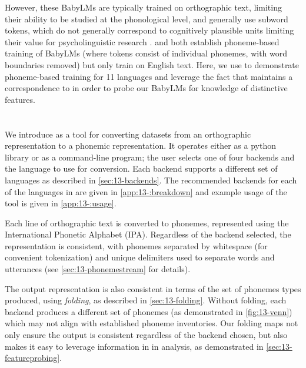 
However, these BabyLMs are typically trained on orthographic text, limiting their ability to be studied at the phonological level, and generally use subword tokens, which do not generally correspond to cognitively plausible units \citep{beinborn-pinter-2023-analyzing} limiting their value for psycholinguistic research \citep{giulianelli-etal-2024-proper}. \citet{bunzeck2024graphemes} and \citet{goriely2024babble} both establish phoneme-based training of BabyLMs (where tokens consist of individual phonemes, with word boundaries removed) but only train on English text. Here, we use \ipachildes to demonstrate phoneme-based training for 11 languages and leverage the fact that \corpusphonemizer maintains a correspondence to \phoible in order to probe our BabyLMs for knowledge of distinctive features. 


\section{\corpusphonemizer}

We introduce \corpusphonemizer as a tool for converting datasets from an orthographic representation to a phonemic representation. It operates either as a python library or as a command-line program; the user selects one of four backends and the language to use for conversion. Each backend supports a different set of languages as described in \cref{sec:13-backends}. The recommended backends for each of the languages in \ipachildes are given in \cref{app:13-:breakdown} and example usage of the tool is given in \cref{app:13-:usage}.

Each line of orthographic text is converted to phonemes, represented using the International Phonetic Alphabet (IPA). Regardless of the backend selected, the representation is consistent, with phonemes separated by whitespace (for convenient tokenization) and unique delimiters used to separate words and utterances (see \cref{sec:13-phonemestream} for details). 

The output representation is also consistent in terms of the set of phonemes types produced, using \emph{folding}, as described in \cref{sec:13-folding}. Without folding, each backend produces a different set of phonemes (as demonstrated in \cref{fig:13-venn}) which may not align with established phoneme inventories. Our folding maps not only ensure the output is consistent regardless of the backend chosen, but also makes it easy to leverage information in \phoible in analysis, as demonstrated in \cref{sec:13-featureprobing}.

